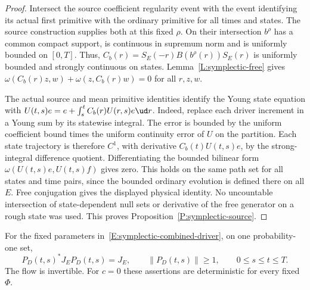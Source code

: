 \begin{proof}
  Intersect the source coefficient regularity event with the
  event identifying its actual first primitive with the ordinary
  primitive for all times and states.
  The source construction supplies both at this fixed $\rho$.
  On their intersection $b^\rho$ has a common compact support,
  is continuous in supremum norm and is uniformly bounded on $[0,T]$.
  Thus,
  $C_b(r)=S_E(-r)B(b^\rho(r))S_E(r)$ is uniformly bounded
  and strongly continuous on states.
  Lemma~\ref{L:symplectic-free} gives
  $\omega(C_b(r)z,w)+\omega(z,C_b(r)w)=0$ for all $r,z,w$.

  The actual source and mean primitive identities identify the
  Young state equation with
  $U(t,s)e=e+\int_s^t C_b(r)U(r,s)e\ud r$.
  Indeed, replace each driver increment in a Young sum by its
  statewise integral. The error is bounded by the uniform coefficient
  bound times the uniform continuity error of $U$ on the partition.
  Each state trajectory is therefore $C^1$, with derivative
  $C_b(t)U(t,s)e$, by the strong-integral difference quotient.
  Differentiating the bounded bilinear form
  $\omega(U(t,s)e,U(t,s)f)$ gives zero.
  This holds on the same path set for all states and time pairs,
  since the bounded ordinary evolution is defined there on all $E$.
  Free conjugation gives the displayed physical identity.
  No uncountable intersection of state-dependent null sets or
  derivative of the free generator on a rough state was used.
  This proves Proposition~\ref{P:symplectic-source}.
\end{proof}

\begin{proposition}
  \label{P:symplectic-raw}
  For the fixed parameters in~\eqref{E:symplectic-combined-driver},
  on one probability-one set,
  \begin{equation}\label{E:symplectic-raw-conservation}
    P_D(t,s)^*J_EP_D(t,s)=J_E,\qquad
    \|P_D(t,s)\|\ge1,\qquad 0\le s\le t\le T .
  \end{equation}
  The flow is invertible. For $c=0$ these assertions are deterministic
  for every fixed $\Phi$.
\end{proposition}

